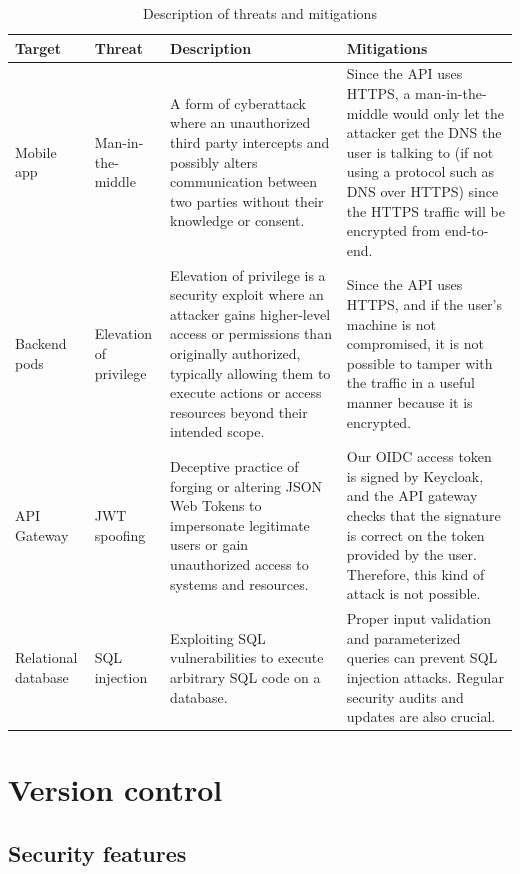 \documentclass[12pt,x11names]{article}
\begin{document}
\begin{table}[htbp] %
  \centering
  \small %
  \begin{tabular}{|p{2.5cm}|p{2.5cm}|p{6cm}|p{5cm}|}
  \hline
  \textbf{Target} & \textbf{Threat} & \textbf{Description} & \textbf{Mitigations} \\ 
  \hline
  Mobile app & Man-in-the-middle & A form of cyberattack where an unauthorized third party intercepts and possibly alters communication between two parties without their knowledge or consent. & Since the API uses HTTPS, a man-in-the-middle would only let the attacker get the DNS the user is talking to (if not using a protocol such as DNS over HTTPS) since the HTTPS traffic will be encrypted from end-to-end. \\ 
  \hline
  Backend pods & Elevation of privilege & Elevation of privilege is a security exploit where an attacker gains higher-level access or permissions than originally authorized, typically allowing them to execute actions or access resources beyond their intended scope. & Since the API uses HTTPS, and if the user's machine is not compromised, it is not possible to tamper with the traffic in a useful manner because it is encrypted. \\ 
  \hline
  API Gateway & JWT spoofing & Deceptive practice of forging or altering JSON Web Tokens to impersonate legitimate users or gain unauthorized access to systems and resources. & Our OIDC access token is signed by Keycloak, and the API gateway checks that the signature is correct on the token provided by the user. Therefore, this kind of attack is not possible. \\ 
  \hline
  Relational database & SQL injection & Exploiting SQL vulnerabilities to execute arbitrary SQL code on a database. & Proper input validation and parameterized queries can prevent SQL injection attacks. Regular security audits and updates are also crucial. \\ 
  \hline
  \end{tabular}
  \caption{Description of threats and mitigations}
\end{table}


\bigskip

\section{Version control}

\subsection{Security features}
\end{document}
